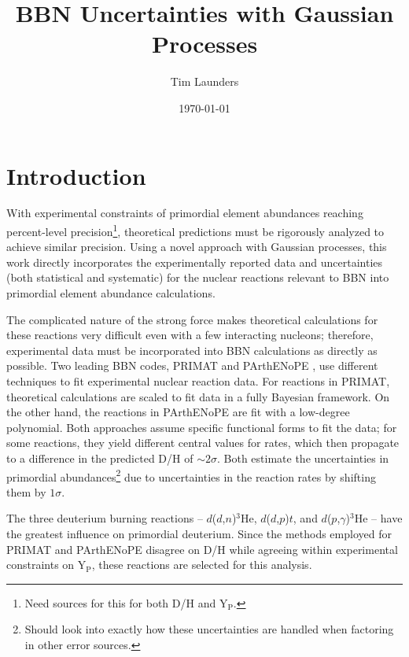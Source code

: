 \documentclass[%
 reprint,
superscriptaddress,
nofootinbib,
 amsmath,amssymb,
 aps,
 pra,
]{revtex4-2}
\makeatletter
\renewcommand\onecolumngrid{%
\do@columngrid{one}{\@ne}%
\def\set@footnotewidth{\textwidth}%
\def\footnoterule{\kern-6pt\hrule width \textwidth\kern6pt}%
}
\makeatother
\begin{document}
\title{BBN Uncertainties with Gaussian Processes}
\author{Tim Launders}

\date{\today}

\maketitle
\setlength{\parskip}{8pt}

\onecolumngrid

\section{Introduction}



With experimental constraints of primordial element abundances reaching percent-level precision\footnote{Need sources for this for both D/H and Y$_\text{P}.$}, theoretical predictions must be rigorously analyzed to achieve similar precision. Using a novel approach with Gaussian processes, this work directly incorporates the experimentally reported data and uncertainties (both statistical and systematic) for the nuclear reactions relevant to BBN into primordial element abundance calculations. 

The complicated nature of the strong force makes theoretical calculations for these reactions very difficult even with a few interacting nucleons; therefore, experimental data must be incorporated into BBN calculations as directly as possible. Two leading BBN codes, PRIMAT \cite{Pitrou2018} and PArthENoPE \cite{Gariazzo2022}, use different techniques to fit experimental nuclear reaction data. For reactions in PRIMAT, theoretical calculations are scaled to fit data in a fully Bayesian framework. On the other hand, the reactions in PArthENoPE are fit with a low-degree polynomial. Both approaches assume specific functional forms to fit the data; for some reactions, they yield different central values for rates, which then propagate to a difference in the predicted D/H of $\sim2\sigma$. Both estimate the uncertainties in primordial abundances\footnote{Should look into exactly how these uncertainties are handled when factoring in other error sources.} due to uncertainties in the reaction rates by shifting them by $1\sigma$.

The three deuterium burning reactions -- $d$($d$,$n$)$^3$He, $d$($d$,$p$)$t$, and $d$($p$,$\gamma$)$^3$He -- have the greatest influence on primordial deuterium. Since the methods employed for PRIMAT and PArthENoPE disagree on D/H while agreeing within experimental constraints on Y$_\text{P}$, these reactions are selected for this analysis. 
\end{document}
